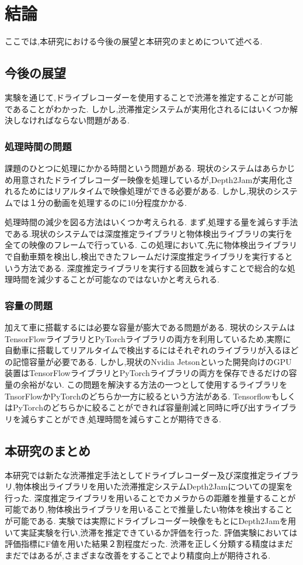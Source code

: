 \chapter{結論}
ここでは,本研究における今後の展望と本研究のまとめについて述べる.
\section{今後の展望}
実験を通じて,ドライブレコーダーを使用することで渋滞を推定することが可能であることがわかった.
しかし,渋滞推定システムが実用化されるにはいくつか解決しなければならない問題がある.
\subsection{処理時間の問題}
課題のひとつに処理にかかる時間という問題がある.
現状のシステムはあらかじめ用意されたドライブレコーダー映像を処理しているが,Depth2Jamが実用化されるためにはリアルタイムで映像処理ができる必要がある.
しかし,現状のシステムでは１分の動画を処理するのに10分程度かかる.

処理時間の減少を図る方法はいくつか考えられる.
まず,処理する量を減らす手法である.現状のシステムでは深度推定ライブラリと物体検出ライブラリの実行を全ての映像のフレームで行っている.
この処理において,先に物体検出ライブラリで自動車類を検出し,検出できたフレームだけ深度推定ライブラリを実行するという方法である.
深度推定ライブラリを実行する回数を減らすことで総合的な処理時間を減少することが可能なのではないかと考えられる.

\subsection{容量の問題}
加えて車に搭載するには必要な容量が膨大である問題がある.
現状のシステムはTensorFlowライブラリとPyTorchライブラリの両方を利用しているため,実際に自動車に搭載してリアルタイムで検出するにはそれぞれのライブラリが入るほどの記憶容量が必要である.
しかし,現状のNvidia Jetsonといった開発向けのGPU装置はTensorFlowライブラリとPyTorchライブラリの両方を保存できるだけの容量の余裕がない.
この問題を解決する方法の一つとして使用するライブラリをTnsorFlowかPyTorchのどちらか一方に絞るという方法がある.
TensorflowもしくはPyTorchのどちらかに絞ることができれば容量削減と同時に呼び出すライブラリを減らすことができ,処理時間を減らすことが期待できる.


\section{本研究のまとめ}
本研究では新たな渋滞推定手法としてドライブレコーダー及び深度推定ライブラリ,物体検出ライブラリを用いた渋滞推定システムDepth2Jamについての提案を行った.
深度推定ライブラリを用いることでカメラからの距離を推量することが可能であり,物体検出ライブラリを用いることで推量したい物体を検出することが可能である.
実験では実際にドライブレコーダー映像をもとにDepth2Jamを用いて実証実験を行い,渋滞を推定できているか評価を行った.
評価実験においては評価指標にF値を用いた結果２割程度だった.
渋滞を正しく分類する精度はまだまだではあるが,さまざまな改善をすることでより精度向上が期待される.
